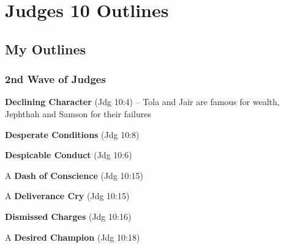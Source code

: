\section{Judges 10 Outlines}

\subsection{My Outlines}

\subsubsection{2nd Wave of Judges}
\begin{compactenum}[I.][8]
    \item  \textbf{Declining Character} (Jdg 10:4) -- Tola and Jair are famous for wealth, Jephthah and Samson for their failures
    \item  \textbf{Desperate Conditions} (Jdg 10:8)
    \item  \textbf{Despicable Conduct} (Jdg 10:6)
    \item  A \textbf{Dash of Conscience} (Jdg 10:15)
    \item  A \textbf{Deliverance Cry} (Jdg 10:15)
    \item   \textbf{Dismissed Charges} (Jdg 10:16)
    \item  A \textbf{Desired Champion} (Jdg 10:18)
\end{compactenum}

